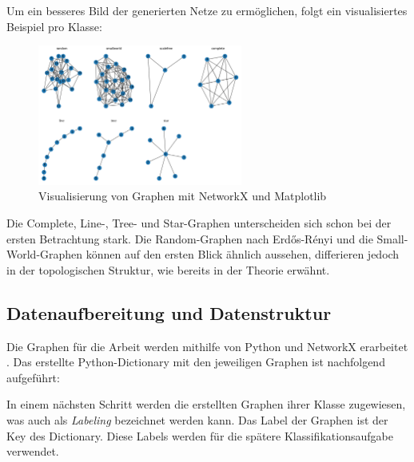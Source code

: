 Um ein besseres Bild der generierten Netze zu ermöglichen, folgt ein visualisiertes Beispiel pro Klasse:

\begin{figure}[H]
    \centering
    \includegraphics[width=0.6\textwidth]{images/42_data/example_graphs.png}
    \caption{Visualisierung von Graphen mit NetworkX und Matplotlib}
    \label{fig:example_graphs}
\end{figure}

Die Complete, Line-, Tree- und Star-Graphen unterscheiden sich schon bei der ersten Betrachtung stark.
Die Random-Graphen nach Erdős-Rényi und die Small-World-Graphen können auf den ersten Blick ähnlich aussehen, differieren jedoch in der topologischen Struktur, wie bereits in der Theorie erwähnt.

\subsection{Datenaufbereitung und Datenstruktur}

Die Graphen für die Arbeit werden mithilfe von Python und NetworkX erarbeitet \cite{hagberg_exploring_2008}.
Das erstellte Python-Dictionary mit den jeweiligen Graphen ist nachfolgend aufgeführt:


In einem nächsten Schritt werden die erstellten Graphen ihrer Klasse zugewiesen, was auch als \emph{Labeling} bezeichnet werden kann. Das Label der Graphen ist der Key des Dictionary.
Diese Labels werden für die spätere Klassifikationsaufgabe verwendet.